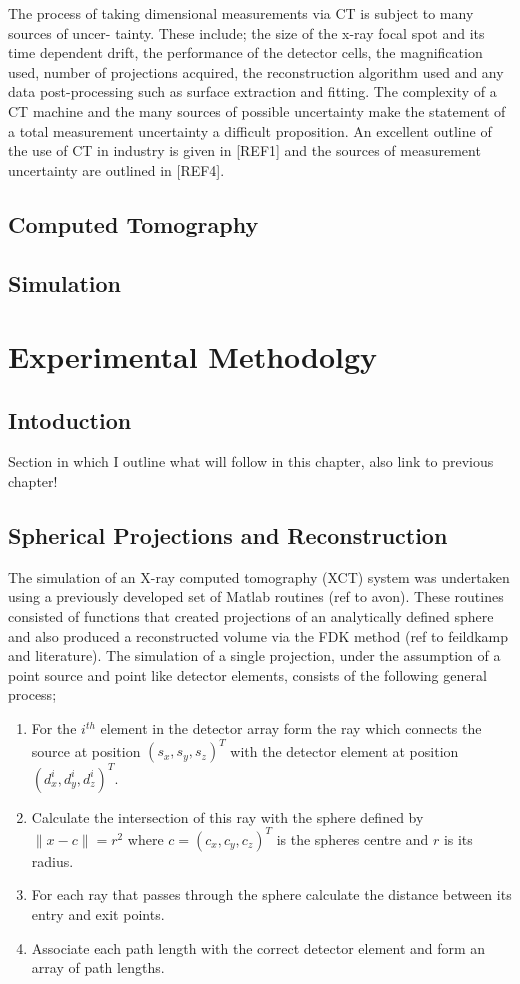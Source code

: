 \documentclass[
  twoside,
  11pt, a4paper,
  footinclude=true,
  headinclude=true,
  cleardoublepage=empty
]{scrbook}
\begin{document}
The process of taking dimensional measurements via CT is subject to many sources of uncer- tainty. These include; the size of the x-ray focal spot and its time dependent drift, the performance of the detector cells, the magnification used, number of projections acquired, the reconstruction algorithm used and any data post-processing such as surface extraction and fitting. The complexity of a CT machine and the many sources of possible uncertainty make the statement of a total measurement uncertainty a difficult proposition. An excellent outline of the use of CT in industry is given in [REF1] and the sources of measurement uncertainty are outlined in [REF4].


\section{Computed Tomography}
\section{Simulation}
\chapter{Experimental Methodolgy}
\section{Intoduction}

Section in which I outline what will follow in this chapter, also link to previous chapter!

\section{Spherical Projections and Reconstruction}

The simulation of an X-ray computed tomography (XCT) system was undertaken using a previously developed set of Matlab routines (ref to avon). These routines consisted of functions that created projections of an analytically defined sphere and also produced a reconstructed volume via the FDK method (ref to feildkamp and literature). The simulation of a single projection, under the assumption of a point source and point like detector elements, consists of the following general process;

\begin{enumerate}
\item For the $i^{th}$ element in the detector array form the ray which connects the source at position $(s_x,s_y,s_z)^T$ with the detector element at position $(d_x^i,d_y^i,d_z^i)^T$.
\item Calculate the intersection of this ray with the sphere defined by $\|x - c\| = r^2$ where $c = (c_x,c_y,c_z)^T$ is the spheres centre and $r$ is its radius.
\item For each ray that passes through the sphere calculate the distance between its entry and exit points.
\item Associate each path length with the correct detector element and form an array of path lengths.
\end{enumerate}
\end{document}
